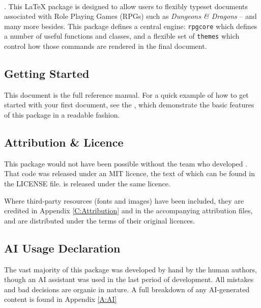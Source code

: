 
~\vfill{}
\begin{center}
	\parbox[c]{0.8\linewidth}{
	\large
	\justifying{}

	. This \LaTeX{} package is designed to allow users to flexibly typeset documents associated with Role Playing Games (RPGs) such as \textit{Dungeons \& Dragons} -- and many more besides. This package defines a central engine: \texttt{rpgcore} which defines a number of useful functions and classes, and a flexible set of \texttt{themes} which control how those commands are rendered in the final document.


	\vspace{1cm}

	\subsection*{Getting Started}

		This document is the full reference manual. For a quick example of how to get started with your first \rpgtex{} document, see the , which demonstrate the basic features of this package in a readable fashion.

		\vspace{1cm}



	\subsection*{Attribution \& Licence}

		This package would not have been possible without the team who developed . That code was released under an MIT licence, the text of which can be found in the LICENSE file. \rpgtex{} is released under the same licence.

		Where third-party resources (fonts and images) have been included, they are credited in Appendix \ref{C:Attribution} and in the accompanying attribution files, and are distributed under the terms of their original licences.

		\vspace{1cm}
	\subsection*{AI Usage Declaration}

		The vast majority of this package was developed by hand by the human authors, though an AI assistant was used in the last period of development. All mistakes and bad decisions are organic in nature. A full breakdown of any AI-generated content is found in Appendix \ref{A:AI}
		}
\end{center}

\vfill{}
